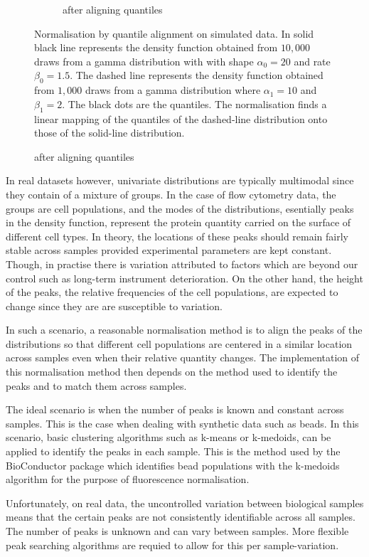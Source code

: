 \begin{figure}[ht]
\begin{subfigure}[b]{.5\textwidth}
\caption{after aligning quantiles}
\end{subfigure}
{Normalisation by quantile alignment on simulated data.}
{
In solid black line represents the density function obtained from $10,000$ draws from a gamma distribution
with with shape $\alpha_0=20$ and rate $\beta_0=1.5$.
The dashed line represents the density function obtained from $1,000$ draws from a gamma distribution
where $\alpha_1=10$ and $\beta_1=2$.
The black dots are the quantiles.
The normalisation finds a linear mapping of the quantiles of the dashed-line distribution onto those of the solid-line distribution.
}
\end{figure}


In real datasets however, univariate distributions are typically multimodal since they contain of a mixture of groups.
In the case of flow cytometry data, the groups are cell populations, and the modes of the distributions, esentially peaks in the density function,
represent the protein quantity carried on the surface of different cell types.
In theory, the locations of these peaks should remain fairly stable across samples provided experimental parameters are kept constant.
Though, in practise there is variation attributed to factors which are beyond our control such as long-term instrument deterioration.
On the other hand, the height of the peaks, the relative frequencies of the cell populations, are expected to change since they are
are susceptible to variation.

In such a scenario, a reasonable normalisation method is to align the peaks of the distributions so that different cell populations are centered
in a similar location across samples even when their relative quantity changes.
The implementation of this normalisation method then depends on the method used to identify the peaks and to match them across samples.

The ideal scenario is when the number of peaks is known and constant across samples.
This is the case when dealing with synthetic data such as beads.
In this scenario, basic clustering algorithms such as k-means or k-medoids, can be applied to identify the peaks in each sample.
This is the method used by the  BioConductor package which identifies bead populations with the k-medoids algorithm
for the purpose of fluorescence normalisation.

Unfortunately, on real data, the uncontrolled variation between biological samples means that the certain peaks are not consistently identifiable across all samples.
The number of peaks is unknown and can vary between samples. 
More flexible peak searching algorithms are requied to allow for this per sample-variation.

